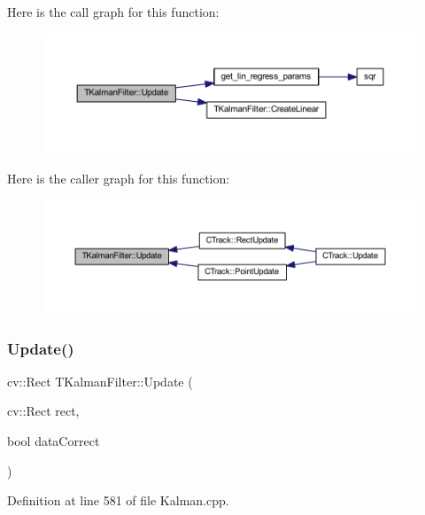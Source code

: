 Here is the call graph for this function\+:\nopagebreak
\begin{figure}[H]
\begin{center}
\leavevmode
\includegraphics[width=350pt]{class_t_kalman_filter_a0c25b9a1a9676956aed0db44ad56696a_cgraph}
\end{center}
\end{figure}
Here is the caller graph for this function\+:\nopagebreak
\begin{figure}[H]
\begin{center}
\leavevmode
\includegraphics[width=350pt]{class_t_kalman_filter_a0c25b9a1a9676956aed0db44ad56696a_icgraph}
\end{center}
\end{figure}
\mbox{\label{class_t_kalman_filter_a8018c71227761d4e7a2d83108eea0220}} 
\subsubsection{\texorpdfstring{Update()}{Update()}\hspace{0.1cm}{\footnotesize\ttfamily [2/2]}}
{\footnotesize\ttfamily cv\+::\+Rect T\+Kalman\+Filter\+::\+Update (\begin{DoxyParamCaption}\item[{cv\+::\+Rect}]{rect,  }\item[{bool}]{data\+Correct }\end{DoxyParamCaption})}



Definition at line 581 of file Kalman.\+cpp.


